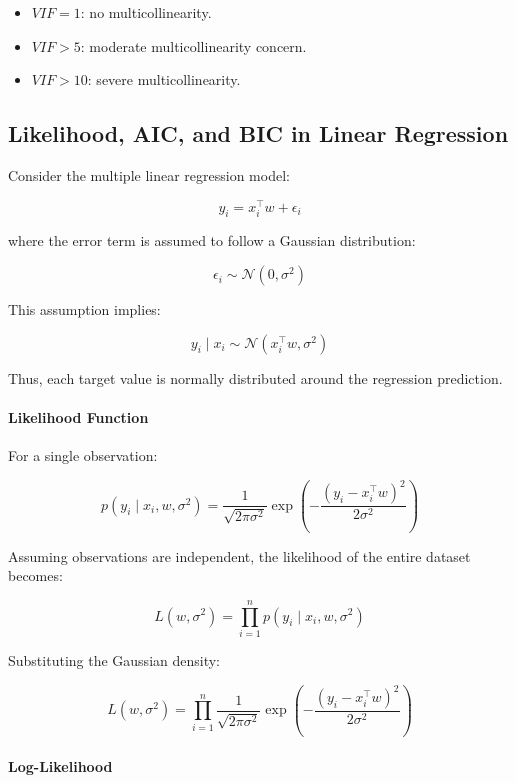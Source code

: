 \documentclass[10pt,a4paper]{article}
\begin{document}
	\begin{itemize}
		\item $VIF = 1$: no multicollinearity.
		\item $VIF > 5$: moderate multicollinearity concern.
		\item $VIF > 10$: severe multicollinearity.
	\end{itemize}
	
	\subsection{Likelihood, AIC, and BIC in Linear Regression}
	
	Consider the multiple linear regression model:
	
	\[
	y_i = x_i^\top w + \epsilon_i
	\]
	
	where the error term is assumed to follow a Gaussian distribution:
	
	\[
	\epsilon_i \sim \mathcal{N}(0,\sigma^2)
	\]
	
	This assumption implies:
	
	\[
	y_i \mid x_i
	\sim
	\mathcal{N}(x_i^\top w,\sigma^2)
	\]
	
	Thus, each target value is normally distributed around the regression prediction.
	
	\vspace{0.5em}
	
	\paragraph{Likelihood Function}
	
	For a single observation:
	
	\[
	p(y_i \mid x_i,w,\sigma^2)
	=
	\frac{1}{\sqrt{2\pi\sigma^2}}
	\exp
	\left(
	-\frac{(y_i-x_i^\top w)^2}{2\sigma^2}
	\right)
	\]
	
	Assuming observations are independent, the likelihood of the entire dataset becomes:
	
	\[
	L(w,\sigma^2)
	=
	\prod_{i=1}^{n}
	p(y_i \mid x_i,w,\sigma^2)
	\]
	
	Substituting the Gaussian density:
	
	\[
	L(w,\sigma^2)
	=
	\prod_{i=1}^{n}
	\frac{1}{\sqrt{2\pi\sigma^2}}
	\exp
	\left(
	-\frac{(y_i-x_i^\top w)^2}{2\sigma^2}
	\right)
	\]
	
	\vspace{0.5em}
	
	\paragraph{Log-Likelihood}
	
\end{document}
